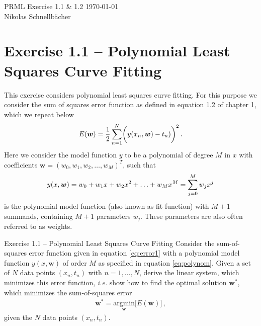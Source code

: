 \documentclass[11pt, DINA4, fleqn]{amsart}
\def\vw{\boldsymbol{w}\xspace}
\begin{document}

\tikzset{node distance=2cm, auto}





\begin{flushleft}
{\sc \Large PRML Exercise 1.1 \& 1.2} \hfill \today \\
\medskip
Nikolas Schnellbächer \underline{\hspace{6.53in}} \\
\end{flushleft}

\section*{Exercise 1.1 -- Polynomial Least Squares Curve Fitting}
This exercise considers polynomial least squares curve fitting. 
For this purpose we consider the sum of squares error function as defined in equation 1.2 of chapter 1, which we repeat below
\begin{align}
E(\vw) = \dfrac{1}{2} \sum \displaylimits_{n = 1}^{N}
\biggl(y(x_n, \vw) - t_n)\biggl)^2 \, .
\label{eq:error1}
\end{align}
Here we consider the model function $y$ to be a polynomial of degree $M$ in $x$ with coefficients $\vw = (w_0, w_1, w_2, \dots , w_M)^{T}$, such that
\begin{align}
y(x,\vw) = w_0 + w_1 x + w_2 x^2 + \dotsc + w_M x^M = \sum \displaylimits_{j = 0}^{M} w_j x^j
\label{eq:polynom}
\end{align}
is the polynomial model function (also known as fit function) with $M + 1$ summands, containing $M+1$ parameters $w_j$. These parameters are also often referred to as weights.

\begin{mybox_tc3}{Exercise 1.1 -- Polynomial Least Squares Curve Fitting}
Consider the sum-of-squares error function given in equation \eqref{eq:error1}
with a polynomial model function $y(x,\vw)$ of order $M$ as specified in equation \eqref{eq:polynom}.
Given a set of $N$ data points $(x_n, t_n)$ with $n = 1, \dotsc, N$,
 derive the linear system, which minimizes this
error function, \textit{i.e.} show how to find the optimal solution $\vw^*$,
which minimizes the sum-of-squares error
\begin{align}
\vw^{*} =  \underset{\vw}{\text{argmin}}\biggl[ E(\vw)\biggl] \, ,
\end{align}
given the $N$ data points $(x_n, t_n)$.
\end{mybox_tc3}
\end{document}

